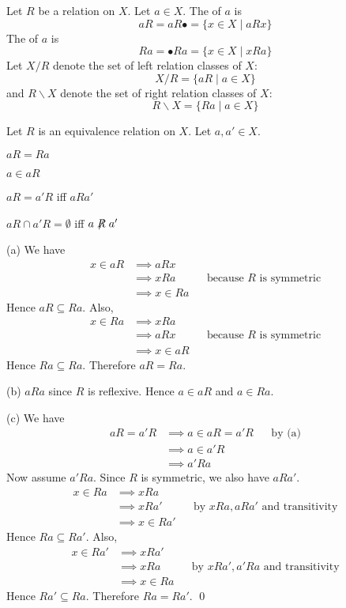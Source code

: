 \begin{defn}
  Let $R$ be a relation on $X$.
  Let $a \in X$.
  The  of $a$ is
  \[
  aR = aR\bullet = \{x \in X \mid aRx\}
  \]
  The  of $a$ is
  \[
  Ra = \bullet Ra = \{x \in X \mid xRa\}
  \]
  Let $X/R$ denote the set of left relation classes of $X$:
  \[
  X/R = \{aR \mid a \in X \}
  \]
  and $R \backslash X$ denote the set of right relation classes of $X$:
  \[
  R\backslash X = \{Ra \mid a \in X \}
  \]
\end{defn}



\begin{prop}
  Let $R$ is an equivalence relation on $X$.
  Let $a,a'\in X$.
  \begin{myenum}
  \item $aR = Ra$
  \item $a \in aR$
  \item $aR = a'R$ iff $aRa'$
  \item $aR \cap a'R = \emptyset$ iff $a \not \mathrel{R} a'$
  \end{myenum}
\end{prop}
\proof
(a) We have
\begin{align*}
  x \in aR
  &\implies aRx \\
  &\implies xRa & & \text{because $R$ is symmetric} \\
  &\implies x \in Ra
\end{align*}
Hence $aR \subseteq Ra$.
Also,
\begin{align*}
  x \in Ra
  &\implies xRa \\
  &\implies aRx & & \text{because $R$ is symmetric} \\
  &\implies x \in aR
\end{align*}
Hence $Ra \subseteq Ra$.
Therefore $aR = Ra$.

(b) $aRa$ since $R$ is reflexive. Hence $a \in aR$ and $a \in Ra$.

(c)
We have
\begin{align*}
  aR = a'R
  &\implies a \in aR = a'R & & \text{by (a)} \\
  &\implies a \in a'R \\
  &\implies a'Ra
\end{align*}
Now assume $a'Ra$.
Since $R$ is symmetric, we also have $aRa'$.
\begin{align*}
  x \in Ra
  &\implies x R a \\
  &\implies x R a' & & \text{by $xRa, aRa'$ and transitivity}\\  
  &\implies x \in Ra'
\end{align*}
Hence $Ra \subseteq Ra'$.
Also,
\begin{align*}
  x \in Ra'
  &\implies xRa' \\
  &\implies xRa & & \text{by $xRa', a'Ra$ and transitivity}\\
  &\implies x \in Ra
\end{align*}
Hence $Ra'\subseteq Ra$.
Therefore $Ra = Ra'$.
\qed

